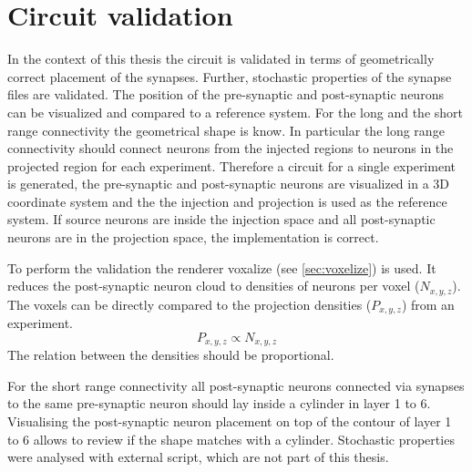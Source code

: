 \section{Circuit validation}
In the context of this thesis the circuit is validated in terms of geometrically correct placement of
the synapses. Further, stochastic properties of the synapse files are validated.
The position of the pre-synaptic and post-synaptic neurons can be visualized and  compared to a 
reference system. For the long and the short range connectivity the geometrical shape is know.
In particular the long range connectivity should connect neurons from the injected regions to neurons
in the projected region for each experiment. Therefore a circuit for a single experiment is 
generated, the pre-synaptic and post-synaptic neurons are visualized in a 3D coordinate system and the the injection
and projection is used as the reference system. If source neurons are inside the injection space and all
post-synaptic neurons are in the projection space, the implementation is correct.

To perform the validation the renderer voxalize (see \ref{sec:voxelize}) is used.
It reduces the post-synaptic neuron cloud to densities of neurons per voxel ($N_{x,y,z}$).
The voxels can be directly compared to the projection densities ($P_{x,y,z}$) from an experiment.
\begin{equation}
	P_{x,y,z} \propto N_{x,y,z}
\end{equation}
The relation between the densities should be proportional.

For the short range connectivity all post-synaptic neurons connected via synapses to the same pre-synaptic neuron should
lay inside a cylinder in layer 1 to 6. Visualising the post-synaptic neuron placement on top of the contour of layer 1 to
6 allows to review if the shape matches with a cylinder.
Stochastic properties were analysed with external script, which are not part of this thesis.

